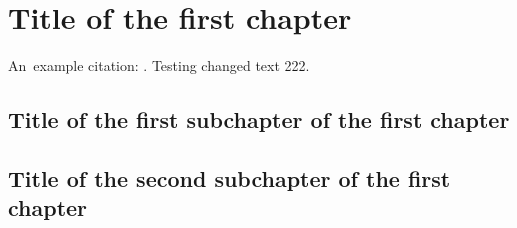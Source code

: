 \chapter{Title of the first chapter}

An~example citation: \cite{Andel07}. Testing changed text 222.

\section{Title of the first subchapter of the first chapter}

\section{Title of the second subchapter of the first chapter}
